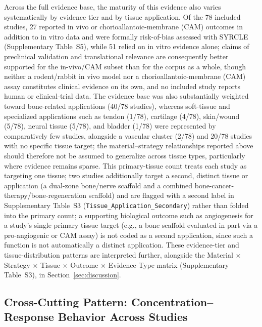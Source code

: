 \documentclass[5p,times,twocolumn]{elsarticle}
\begin{document}
Across the full evidence base, the maturity of this evidence also varies systematically by evidence tier and by tissue application. Of the 78 included studies, 27 reported in vivo or chorioallantoic-membrane (CAM) outcomes in addition to in vitro data and were formally risk-of-bias assessed with SYRCLE (Supplementary Table~S5), while 51 relied on in vitro evidence alone; claims of preclinical validation and translational relevance are consequently better supported for the in-vivo/CAM subset than for the corpus as a whole, though neither a rodent/rabbit in vivo model nor a chorioallantoic-membrane (CAM) assay constitutes clinical evidence on its own, and no included study reports human or clinical-trial data. The evidence base was also substantially weighted toward bone-related applications (40/78 studies), whereas soft-tissue and specialized applications such as tendon (1/78), cartilage (4/78), skin/wound (5/78), neural tissue (5/78), and bladder (1/78) were represented by comparatively few studies, alongside a vascular cluster (2/78) and 20/78 studies with no specific tissue target; the material--strategy relationships reported above should therefore not be assumed to generalize across tissue types, particularly where evidence remains sparse. This primary-tissue count treats each study as targeting one tissue; two studies additionally target a second, distinct tissue or application (a dual-zone bone/nerve scaffold and a combined bone-cancer-therapy/bone-regeneration scaffold) and are flagged with a second label in Supplementary Table~S3 (\texttt{Tissue\_Application\_Secondary}) rather than folded into the primary count; a supporting biological outcome such as angiogenesis for a study's single primary tissue target (e.g., a bone scaffold evaluated in part via a pro-angiogenic or CAM assay) is not coded as a second application, since such a function is not automatically a distinct application. These evidence-tier and tissue-distribution patterns are interpreted further, alongside the Material $\times$ Strategy $\times$ Tissue $\times$ Outcome $\times$ Evidence-Type matrix (Supplementary Table~S3), in Section~\ref{sec:discussion}.

\subsection{Cross-Cutting Pattern: Concentration--Response Behavior Across Studies}
\label{sec:pattern}
\end{document}
